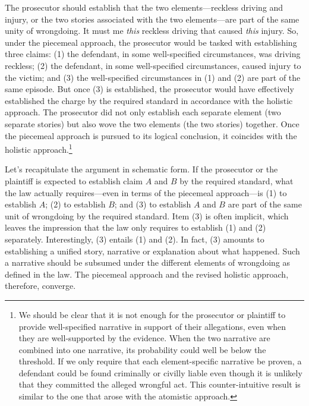 \documentclass[
  10pt,
  dvipsnames,enabledeprecatedfontcommands]{scrartcl}
\begin{document}
The prosecutor should establish that the two elements---reckless driving
and injury, or the two stories associated with the two elements---are
part of the same unity of wrongdoing. It must me \emph{this} reckless
driving that caused \emph{this} injury. So, under the piecemeal
approach, the prosecutor would be tasked with establishing three claims:
(1) the defendant, in some well-specified circumstances, was driving
reckless; (2) the defendant, in some well-specified circumstances,
caused injury to the victim; and (3) the well-specified circumstances in
(1) and (2) are part of the same episode. But once (3) is established,
the prosecutor would have effectively established the charge by the
required standard in accordance with the holistic approach. The
prosecutor did not only establish each separate element (two separate
stories) but also wove the two elements (the two stories) together. Once
the piecemeal approach is pursued to its logical conclusion, it
coincides with the holistic approach.\footnote{We should be clear that
  it is not enough for the prosecutor or plaintiff to provide
  well-specified narrative in support of their allegations, even when
  they are well-supported by the evidence. When the two narrative are
  combined into one narrative, its probability could well be below the
  threshold. If we only require that each element-specific narrative be
  proven, a defendant could be found criminally or civilly liable even
  though it is unlikely that they committed the alleged wrongful act.
  This counter-intuitive result is similar to the one that arose with
  the atomistic approach.}

Let's recapitulate the argument in schematic form. If the prosecutor or
the plaintiff is expected to establish claim \(A\) and \(B\) by the
required standard, what the law actually requires---even in terms of the
piecemeal approach---is (1) to establish \(A\); (2) to establish \(B\);
and (3) to establish \(A\) and \(B\) are part of the same unit of
wrongdoing by the required standard. Item (3) is often implicit, which
leaves the impression that the law only requires to establish (1) and
(2) separately. Interestingly, (3) entails (1) and (2). In fact, (3)
amounts to establishing a unified story, narrative or explanation about
what happened. Such a narrative should be subsumed under the different
elements of wrongdoing as defined in the law. The piecemeal approach and
the revised holistic approach, therefore, converge.
\end{document}
